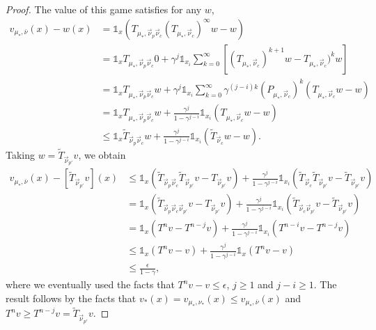 \documentclass{article}
\def\1{{\mathds 1}}
\begin{document}
\begin{proof}
  The value of this game satisfies for any $w$,
  \begin{align}
    v_{\mu_*,\bar\nu}(x) - w(x)& = \1_x (T_{\mu_*,\vec\nu_p\vec\nu_c} (T_{\mu_*,\vec\nu_c})^\infty w - w)\\
    & = \1_x  T_{\mu_*,\vec\nu_p\vec\nu_c} 0 + \gamma^{j} \1_{x_i} \sum_{k=0}^{\infty} [(T_{\mu_*,\vec\nu_c})^{k+1} w - T_{\mu_*,\vec\nu_c})^k w] \\
    & = \1_x  T_{\mu_*,\vec\nu_p\vec\nu_c} w + \gamma^{j} \1_{x_i} \sum_{k=0}^{\infty} \gamma^{(j-i)k}(P_{\mu_*,\vec\nu_c})^k (T_{\mu_*,\vec\nu_c} w -  w)  \\
    &=\1_x  T_{\mu_*,\vec\nu_p\vec\nu_c} w + \frac{\gamma^{j}}{1-\gamma^{j-i}}\1_{x_i} (T_{\mu_*,\vec\nu_c} w -  w)  \\
    &\le \1_x  \tilde T_{\vec\nu_p\vec\nu_c} w + \frac{\gamma^{j}}{1-\gamma^{j-i}}\1_{x_i} (\tilde T_{\vec\nu_c} w -  w).
  \end{align}
  Taking $w = \tilde T_{\vec\nu_{p'}}v$, we obtain
  \begin{align}
    v_{\mu_*,\bar\nu}(x) - [ \tilde T_{\vec\nu_{p'}}v](x) & \le \1_x  (\tilde T_{\vec\nu_p\vec\nu_c} \tilde T_{\vec\nu_{p'}}v-T_{\vec\nu_{p'}}v) + \frac{\gamma^{j} }{1-\gamma^{j-i}}\1_{x_i} ( \tilde T_{\vec\nu_c} \tilde T_{\vec\nu_{p'}}v - \tilde T_{\vec\nu_{p'}} v )\\
    & = \1_x  (\tilde T_{\vec\nu_p\vec\nu_c\vec\nu_{p'}}v - T_{\vec\nu_{p'}}v)+ \frac{\gamma^{j} }{1-\gamma^{j-i}} \1_{x_i}(\tilde T_{\vec\nu_c\vec\nu_{p'}}v -  \tilde T_{\vec\nu_{p'}} v ) \\
    & = \1_x (T^nv - T^{n-j}v) + \frac{\gamma^{j}}{1-\gamma^{j-i}}  \1_{x_i} (T^{n-i}v -  T^{n-j}v ) \\
    & \le \1_x (T^nv - v) + \frac{\gamma^{j}}{1-\gamma^{j-i}}  \1_x (T^n v - v) \\
    & \le \frac{\epsilon}{1-\gamma},
  \end{align}
  where we eventually used the facts that $T^nv - v \le \epsilon$, $j \ge 1$ and $j-i \ge 1$.
The result follows by the facts that $v_*(x) = v_{\mu_*,\nu_*}(x) \le v_{\mu_*,\bar\nu}(x)$ and $T^n v \ge T^{n-j}v = \tilde T_{\vec\nu_{p'}}v$.
\end{proof}



 





\end{document}

